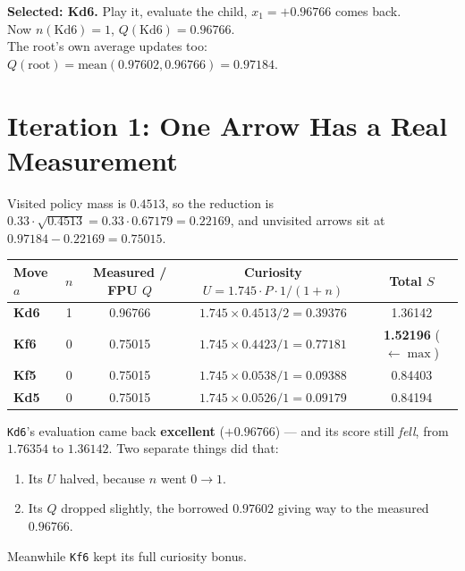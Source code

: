 \begin{realdata}
\textbf{Selected: Kd6.} Play it, evaluate the child, $x_1 = +0.96766$ comes back.\\
Now $n(\text{Kd6}) = 1$, $Q(\text{Kd6}) = 0.96766$.\\
The root's own average updates too: $Q(\text{root}) = \text{mean}(0.97602, 0.96766) = 0.97184$.
\end{realdata}

\section{Iteration 1: One Arrow Has a Real Measurement}

Visited policy mass is $0.4513$, so the reduction is $0.33 \cdot \sqrt{0.4513} = 0.33 \cdot 0.67179 = 0.22169$, and unvisited arrows sit at $0.97184 - 0.22169 = 0.75015$.

\begin{center}
\small
\begin{tabular}{lcccc}
  \toprule
  Move $a$ & $n$ & Measured / FPU $Q$ & Curiosity $U = 1.745 \cdot P \cdot 1 / (1+n)$ & Total $S$ \\
  \midrule
  \textbf{Kd6} & 1 & 0.96766 & $1.745 \times 0.4513 / 2 = 0.39376$ & 1.36142 \\
  \textbf{Kf6} & 0 & 0.75015 & $1.745 \times 0.4423 / 1 = 0.77181$ & \textbf{1.52196} \hfill ($\leftarrow \max$) \\
  \textbf{Kf5} & 0 & 0.75015 & $1.745 \times 0.0538 / 1 = 0.09388$ & 0.84403 \\
  \textbf{Kd5} & 0 & 0.75015 & $1.745 \times 0.0526 / 1 = 0.09179$ & 0.84194 \\
  \bottomrule
\end{tabular}
\end{center}

\texttt{Kd6}'s evaluation came back \textbf{excellent} ($+0.96766$) --- and its score still \textit{fell}, from $1.76354$ to $1.36142$. Two separate things did that:
\begin{enumerate}[leftmargin=2em]
  \item Its $U$ halved, because $n$ went $0 \to 1$.
  \item Its $Q$ dropped slightly, the borrowed $0.97602$ giving way to the measured $0.96766$.
\end{enumerate}
Meanwhile \texttt{Kf6} kept its full curiosity bonus.

\begin{center}
\begin{minipage}{\linewidth}
\centering

\label{fig:iter1}
\end{minipage}
\end{center}

